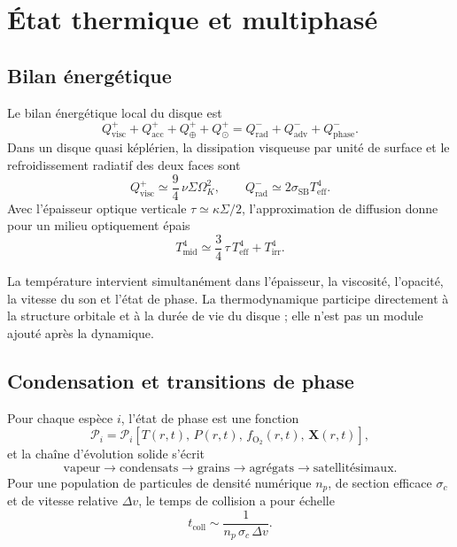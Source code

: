 \documentclass[11pt,a4paper,openany]{report}
\begin{document}
\section{État thermique et multiphasé}
\subsection{Bilan énergétique}

Le bilan énergétique local du disque est
\begin{equation}
Q^{+}_{\mathrm{visc}}+Q^{+}_{\mathrm{acc}}+Q^{+}_{\oplus}+Q^{+}_{\odot}
=Q^{-}_{\mathrm{rad}}+Q^{-}_{\mathrm{adv}}+Q^{-}_{\mathrm{phase}}.
\label{eq:bilanE}
\end{equation}
Dans un disque quasi képlérien, la dissipation visqueuse par unité de surface et le
refroidissement radiatif des deux faces sont
\begin{equation}
Q^{+}_{\mathrm{visc}}\simeq\frac94\,\nu\Sigma\Omega_K^2,
\qquad
Q^{-}_{\mathrm{rad}}\simeq2\sigma_{\mathrm{SB}}T_{\mathrm{eff}}^4.
\label{eq:Qvisc}
\end{equation}
Avec l'épaisseur optique verticale $\tau\simeq\kappa\Sigma/2$, l'approximation de diffusion
donne pour un milieu optiquement épais
\begin{equation}
T_{\mathrm{mid}}^4\simeq\frac34\,\tau\,T_{\mathrm{eff}}^4+T_{\mathrm{irr}}^4.
\label{eq:Tmid}
\end{equation}

\begin{lecture}
La température intervient simultanément dans l'épaisseur, la viscosité, l'opacité, la vitesse du
son et l'état de phase. La thermodynamique participe directement à la structure orbitale et à la
durée de vie du disque ; elle n'est pas un module ajouté après la dynamique.
\end{lecture}

\subsection{Condensation et transitions de phase}

Pour chaque espèce $i$, l'état de phase est une fonction
\begin{equation}
\mathcal{P}_i=\mathcal{P}_i\!\left[T(r,t),\,P(r,t),\,f_{\mathrm{O_2}}(r,t),\,\mathbf{X}(r,t)\right],
\label{eq:phase}
\end{equation}
et la chaîne d'évolution solide s'écrit
\begin{equation}
\text{vapeur}\rightarrow\text{condensats}\rightarrow\text{grains}\rightarrow
\text{agrégats}\rightarrow\text{satellitésimaux}.
\label{eq:chaine}
\end{equation}
Pour une population de particules de densité numérique $n_p$, de section efficace $\sigma_c$ et
de vitesse relative $\Delta v$, le temps de collision a pour échelle
\begin{equation}
t_{\mathrm{coll}}\sim\frac{1}{n_p\,\sigma_c\,\Delta v}.
\label{eq:tcoll}
\end{equation}
\end{document}

